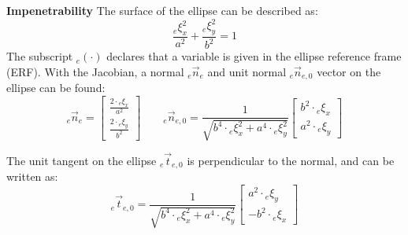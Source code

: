 
\noindent
\textbf{Impenetrability}
The surface of the ellipse can be described as:
\begin{equation}
 \frac {{}_{e}\xi_x ^ 2}{a^2} + \frac{{}_e\xi_y^2}{b^2} = 1
\end{equation}
The subscript ${}_e (\cdot)$ declares that a variable is given in the ellipse reference frame (ERF).
With the Jacobian, a normal ${}_e \vec n_e$ and unit normal ${}_e \vec n_{e,0}$ vector on the ellipse can be found:
\begin{equation}
  {}_e \vec{n}_e =
  \begin{bmatrix}
    \frac{2 \cdot {}_e \xi_x}{a^2} \\
    \frac{2 \cdot {}_e \xi_y}{b^2}
  \end{bmatrix}
  \qquad
  {}_e \vec{n}_{e,0} =
  \frac{1}{\sqrt{b^4 \cdot {}_e\xi_x^2 + a^4 \cdot{}_e \xi_y^2}}
  \begin{bmatrix}
    b^2 \cdot {}_e\xi_x \\
    a^2 \cdot {}_e\xi_y
  \end{bmatrix}
\end{equation}

The unit tangent on the ellipse ${}_e\vec t_{e,0}$ is perpendicular to the normal, and can be written as:
\begin{equation}
  {}_e \vec{t}_{e,0} =
  \frac{1}{\sqrt{b^4 \cdot {}_e\xi_x^2 + a^4 \cdot{}_e \xi_y^2}}
  \begin{bmatrix}
    a^2 \cdot {}_e\xi_y \\
    - b^2 \cdot {}_e\xi_x
  \end{bmatrix}
\end{equation}

